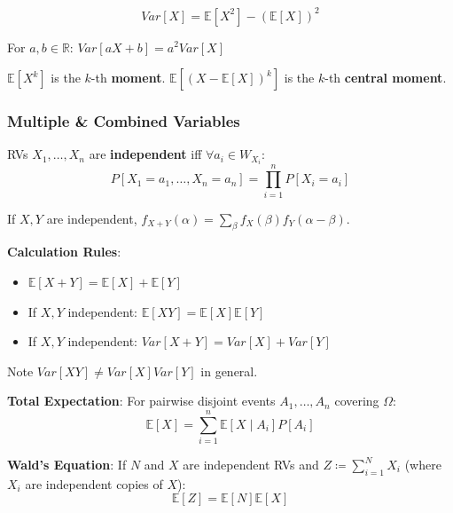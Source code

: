 \begin{theorem}
$$Var[X] = \mathbb{E}[X^2] - (\mathbb{E}[X])^2$$
\end{theorem}

\begin{lemma}
For $a, b \in \mathbb{R}$: $Var[aX+b] = a^2 Var[X]$
\end{lemma}

\begin{definition}
$\mathbb{E}[X^k]$ is the $k$-th \textbf{moment}. $\mathbb{E}[(X-\mathbb{E}[X])^k]$ is the $k$-th \textbf{central moment}.
\end{definition}

\subsubsection{Multiple \& Combined Variables}

\begin{definition}
RVs $X_1, \dots, X_n$ are \textbf{independent} iff $\forall a_i \in W_{X_i}$:
$$P[X_1=a_1, \dots, X_n=a_n] = \prod_{i=1}^n P[X_i=a_i]$$
\end{definition}

\begin{theorem}
If $X, Y$ are independent, $f_{X+Y}(\alpha) = \sum_{\beta} f_X(\beta) f_Y(\alpha-\beta)$.
\end{theorem}

\begin{remark}
\textbf{Calculation Rules}:
\begin{itemize}
    \item $\mathbb{E}[X+Y] = \mathbb{E}[X] + \mathbb{E}[Y]$
    \item If $X, Y$ independent: $\mathbb{E}[XY] = \mathbb{E}[X] \mathbb{E}[Y]$
    \item If $X, Y$ independent: $Var[X+Y] = Var[X] + Var[Y]$
\end{itemize}
Note $Var[XY] \neq Var[X]Var[Y]$ in general.
\end{remark}

\begin{theorem}
\textbf{Total Expectation}: For pairwise disjoint events $A_1, \dots, A_n$ covering $\Omega$:
$$\mathbb{E}[X] = \sum_{i=1}^n \mathbb{E}[X \mid A_i] P[A_i]$$
\end{theorem}

\begin{theorem}
\textbf{Wald's Equation}: If $N$ and $X$ are independent RVs and $Z \coloneqq \sum_{i=1}^N X_i$ (where $X_i$ are independent copies of $X$):
$$\mathbb{E}[Z] = \mathbb{E}[N] \mathbb{E}[X]$$
\end{theorem}

